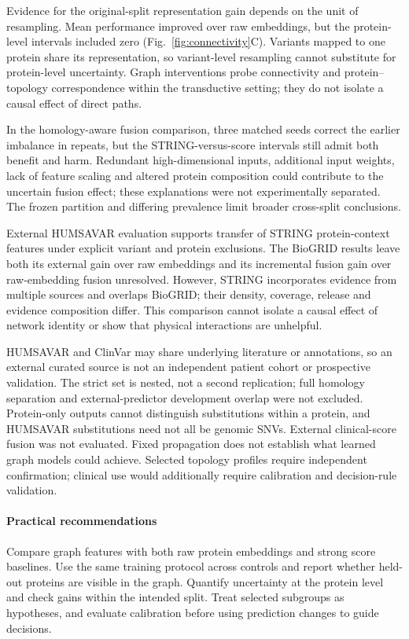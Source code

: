 \documentclass[conference]{IEEEtran}
\begin{document}
Evidence for the original-split representation gain depends on the unit of resampling. Mean performance improved over raw embeddings, but the protein-level intervals included zero (Fig.~\ref{fig:connectivity}C). Variants mapped to one protein share its representation, so variant-level resampling cannot substitute for protein-level uncertainty. Graph interventions probe connectivity and protein--topology correspondence within the transductive setting; they do not isolate a causal effect of direct paths.

In the homology-aware fusion comparison, three matched seeds correct the earlier imbalance in repeats, but the STRING-versus-score intervals still admit both benefit and harm. Redundant high-dimensional inputs, additional input weights, lack of feature scaling and altered protein composition could contribute to the uncertain fusion effect; these explanations were not experimentally separated. The frozen partition and differing prevalence limit broader cross-split conclusions.

External HUMSAVAR evaluation supports transfer of STRING protein-context features under explicit variant and protein exclusions. The BioGRID results leave both its external gain over raw embeddings and its incremental fusion gain over raw-embedding fusion unresolved. However, STRING incorporates evidence from multiple sources and overlaps BioGRID; their density, coverage, release and evidence composition differ. This comparison cannot isolate a causal effect of network identity or show that physical interactions are unhelpful.

HUMSAVAR and ClinVar may share underlying literature or annotations, so an external curated source is not an independent patient cohort or prospective validation. The strict set is nested, not a second replication; full homology separation and external-predictor development overlap were not excluded. Protein-only outputs cannot distinguish substitutions within a protein, and HUMSAVAR substitutions need not all be genomic SNVs. External clinical-score fusion was not evaluated. Fixed propagation does not establish what learned graph models could achieve. Selected topology profiles require independent confirmation; clinical use would additionally require calibration and decision-rule validation.

\paragraph{Practical recommendations}
Compare graph features with both raw protein embeddings and strong score baselines. Use the same training protocol across controls and report whether held-out proteins are visible in the graph. Quantify uncertainty at the protein level and check gains within the intended split. Treat selected subgroups as hypotheses, and evaluate calibration before using prediction changes to guide decisions.
\end{document}
